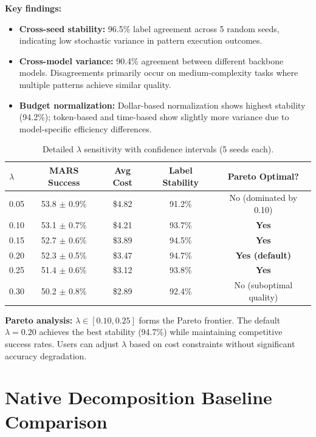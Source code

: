 \documentclass{article}
\theoremstyle{plain}
\theoremstyle{definition}
\theoremstyle{remark}
\begin{document}
\textbf{Key findings:}
\begin{itemize}[nosep,leftmargin=*]
\item \textbf{Cross-seed stability:} 96.5\% label agreement across 5 random seeds, indicating low stochastic variance in pattern execution outcomes.
\item \textbf{Cross-model variance:} 90.4\% agreement between different backbone models. Disagreements primarily occur on medium-complexity tasks where multiple patterns achieve similar quality.
\item \textbf{Budget normalization:} Dollar-based normalization shows highest stability (94.2\%); token-based and time-based show slightly more variance due to model-specific efficiency differences.
\end{itemize}

\begin{table}[h]
\centering
\caption{Detailed $\lambda$ sensitivity with confidence intervals (5 seeds each).}
\label{tab:lambda-detailed}
\small
\begin{tabular}{lcccc}
\toprule
$\lambda$ & \textbf{MARS Success} & \textbf{Avg Cost} & \textbf{Label Stability} & \textbf{Pareto Optimal?} \\
\midrule
0.05 & 53.8 $\pm$ 0.9\% & \$4.82 & 91.2\% & No (dominated by 0.10) \\
0.10 & 53.1 $\pm$ 0.7\% & \$4.21 & 93.7\% & \textbf{Yes} \\
0.15 & 52.7 $\pm$ 0.6\% & \$3.89 & 94.5\% & \textbf{Yes} \\
0.20 & 52.3 $\pm$ 0.5\% & \$3.47 & 94.7\% & \textbf{Yes (default)} \\
0.25 & 51.4 $\pm$ 0.6\% & \$3.12 & 93.8\% & \textbf{Yes} \\
0.30 & 50.2 $\pm$ 0.8\% & \$2.89 & 92.4\% & No (suboptimal quality) \\
\bottomrule
\end{tabular}
\end{table}

\textbf{Pareto analysis:} $\lambda \in [0.10, 0.25]$ forms the Pareto frontier. The default $\lambda=0.20$ achieves the best stability (94.7\%) while maintaining competitive success rates. Users can adjust $\lambda$ based on cost constraints without significant accuracy degradation.

\section{Native Decomposition Baseline Comparison}
\label{app:native-decomposition}
\end{document}
